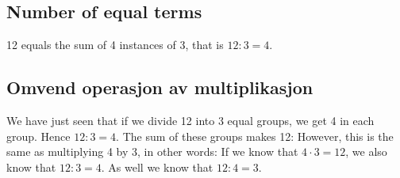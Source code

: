 \subsection*{Number of equal terms}
12 equals the sum of 4 instances of 3, that is $ 12:3=4 $.


\subsection*{Omvend operasjon av multiplikasjon}
We have just seen that if we divide 12 into 3 equal groups, we get 4 in each group. Hence $ 12:3=4$. The sum of these groups makes 12: 
However, this is the same as multiplying 4 by 3, in other words:
If we know that $ {4\cdot 3=12} $, we also know that $ {12:3=4} $. As well we know that $ {12:4=3} $. 





